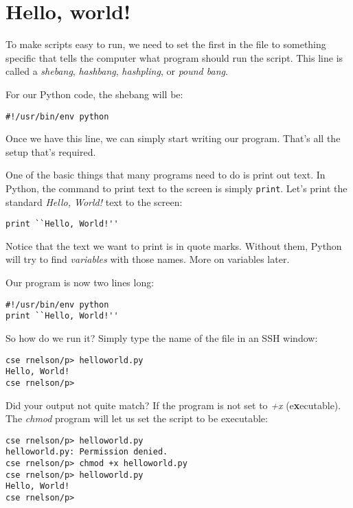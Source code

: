 \documentclass[11pt, letterpaper]{article}
\begin{document}
\section*{Hello, world!}

To make scripts easy to run, we need to set the first in the file to something specific that tells the computer what program should run the script. This line is called a {\em shebang}, {\em hashbang}, {\em hashpling}, or {\em pound bang}.

For our Python code, the shebang will be:

\begin{lstlisting}
#!/usr/bin/env python
\end{lstlisting}

Once we have this line, we can simply start writing our program. That's all the setup that's required.

One of the basic things that many programs need to do is print out text. In Python, the command to print text to the screen is simply {\tt print}. Let's print the standard {\em Hello, World!} text to the screen:

\begin{lstlisting}
print ``Hello, World!''
\end{lstlisting}

Notice that the text we want to print is in quote marks. Without them, Python will try to find {\em variables} with those names. More on variables later.

Our program is now two lines long:

\begin{lstlisting}
#!/usr/bin/env python
print ``Hello, World!''
\end{lstlisting}

So how do we run it? Simply type the name of the file in an SSH window:

\begin{lstlisting}
cse rnelson/p> helloworld.py 
Hello, World!
cse rnelson/p>
\end{lstlisting}

Did your output not quite match? If the program is not set to {\em +x} (e{\bf x}ecutable). The {\em chmod} program will let us set the script to be executable:

\begin{lstlisting}
cse rnelson/p> helloworld.py
helloworld.py: Permission denied.
cse rnelson/p> chmod +x helloworld.py 
cse rnelson/p> helloworld.py
Hello, World!
cse rnelson/p>
\end{lstlisting}
\end{document}
